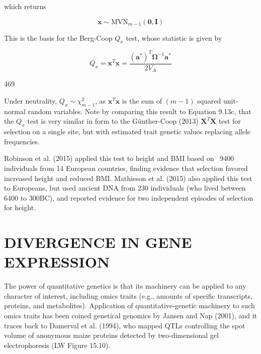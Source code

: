 \documentclass{article}
\begin{document}
which returns

\begin{equation}
\mathbf{x}\sim\mathrm{MVN}_{m-1}(\mathbf{0},\mathbf{I})
\tag{13.33g}
\label{eq:13_33g}
\end{equation}

This is the basis for the Berg-Coop  $ Q_{x} $ test, whose statistic is given by

\begin{equation}
Q_{x}=\mathbf{x}^{T}\mathbf{x}=\frac{(\mathbf{a}^{*})^{T}\boldsymbol{\Omega}^{-1}\mathbf{a}^{*}}{2V_{A}}
\tag{12.33h}
\label{eq:12_33h}
\end{equation}

469

Under neutrality,  $ Q_x \sim \chi^2_{m-1} $, as  $ \mathbf{x}^T \mathbf{x} $ is the sum of  $ (m-1) $ squared unit-normal random variables. Note by comparing this result to Equation 9.13c, that the  $ Q_x $ test is very similar in form to the Günther-Coop (2013)  $ \mathbf{X}^T \mathbf{X} $ test for selection on a single site, but with estimated trait genetic values replacing allele frequencies.

Robinson et al. (2015) applied this test to height and BMI based on ~9400 individuals from 14 European countries, finding evidence that selection favored increased height and reduced BMI. Mathieson et al. (2015) also applied this test to Europeans, but used ancient DNA from 230 individuals (who lived between 6400 to 300BC), and reported evidence for two independent episodes of selection for height.

\section{DIVERGENCE IN GENE EXPRESSION}
The power of quantitative genetics is that its machinery can be applied to any character of interest, including omics traits (e.g., amounts of specific transcripts, proteins, and metabolites). Application of quantitative-genetic machinery to such omics traits has been coined
genetical genomics by Jansen and Nap (2001), and it traces back to Damerval et al. (1994), who mapped QTLs controlling the spot volume of anonymous maize proteins detected by two-dimensional gel electrophoresis (LW Figure 15.10).
\end{document}
